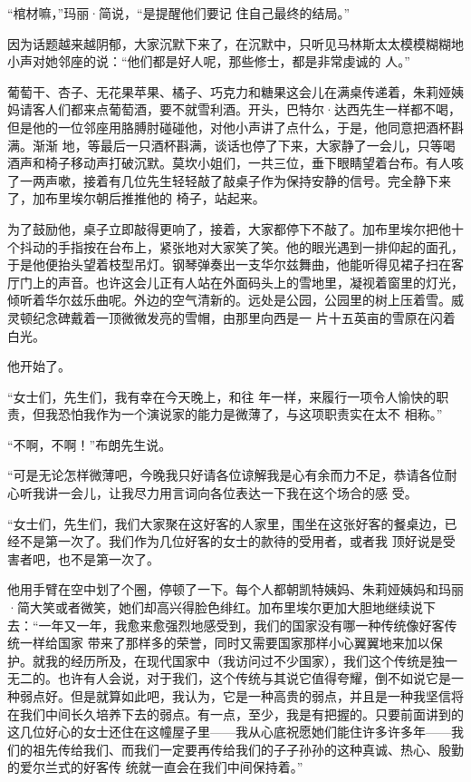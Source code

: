 \documentclass{article}
\begin{document}
“棺材嘛，”玛丽·简说，“是提醒他们要记
住自己最终的结局。” 

因为话题越来越阴郁，大家沉默下来了，在沉默中，只听见马林斯太太模模糊糊地小声对她邻座的说：“他们都是好人呢，那些修士，都是非常虔诚的
人。” 

葡萄干、杏子、无花果苹果、橘子、巧克力和糖果这会儿在满桌传递着，朱莉娅姨妈请客人们都来点葡萄酒，要不就雪利酒。开头，巴特尔·达西先生一样都不喝，但是他的一位邻座用胳膊肘碰碰他，对他小声讲了点什么，于是，他同意把酒杯斟满。渐渐
\newpage
地，等最后一只酒杯斟满，谈话也停了下来，大家静了一会儿，只等喝酒声和椅子移动声打破沉默。莫坎小姐们，一共三位，垂下眼睛望着台布。有人咳了一两声嗽，接着有几位先生轻轻敲了敲桌子作为保持安静的信号。完全静下来了，加布里埃尔朝后推推他的
椅子，站起来。 

为了鼓励他，桌子立即敲得更响了，接着，大家都停下不敲了。加布里埃尔把他十个抖动的手指按在台布上，紧张地对大家笑了笑。他的眼光遇到一排仰起的面孔，于是他便抬头望着枝型吊灯。钢琴弹奏出一支华尔兹舞曲，他能听得见裙子扫在客厅门上的声音。也许这会儿正有人站在外面码头上的雪地里，凝视着窗里的灯光，倾听着华尔兹乐曲呢。外边的空气清新的。远处是公园，公园里的树上压着雪。威灵顿纪念碑戴着一顶微微发亮的雪帽，由那里向西是一
片十五英亩的雪原在闪着白光。 


他开始了。 

“女士们，先生们，我有幸在今天晚上，和往
\newpage
年一样，来履行一项令人愉快的职责，但我恐怕我作为一个演说家的能力是微薄了，与这项职责实在太不
相称。” 


“不啊，不啊！”布朗先生说。 

“可是无论怎样微薄吧，今晚我只好请各位谅解我是心有余而力不足，恭请各位耐心听我讲一会儿，让我尽力用言词向各位表达一下我在这个场合的感
受。 

“女士们，先生们，我们大家聚在这好客的人家里，围坐在这张好客的餐桌边，已经不是第一次了。我们作为几位好客的女士的款待的受用者，或者我
顶好说是受害者吧，也不是第一次了。 

他用手臂在空中划了个圈，停顿了一下。每个人都朝凯特姨妈、朱莉娅姨妈和玛丽·简大笑或者微笑，她们却高兴得脸色绯红。加布里埃尔更加大胆地继续说下去：“一年又一年，我愈来愈强烈地感受到，我们的国家没有哪一种传统像好客传统一样给国家
\newpage
带来了那样多的荣誉，同时又需要国家那样小心翼翼地来加以保护。就我的经历所及，在现代国家中（我访问过不少国家），我们这个传统是独一无二的。也许有人会说，对于我们，这个传统与其说它值得夸耀，倒不如说它是一种弱点好。但是就算如此吧，我认为，它是一种高贵的弱点，并且是一种我坚信将在我们中间长久培养下去的弱点。有一点，至少，我是有把握的。只要前面讲到的这几位好心的女士还住在这幢屋子里——我从心底祝愿她们能住许多许多年——我们的祖先传给我们、而我们一定要再传给我们的子子孙孙的这种真诚、热心、殷勤的爱尔兰式的好客传
统就一直会在我们中间保持着。” 
\end{document}
